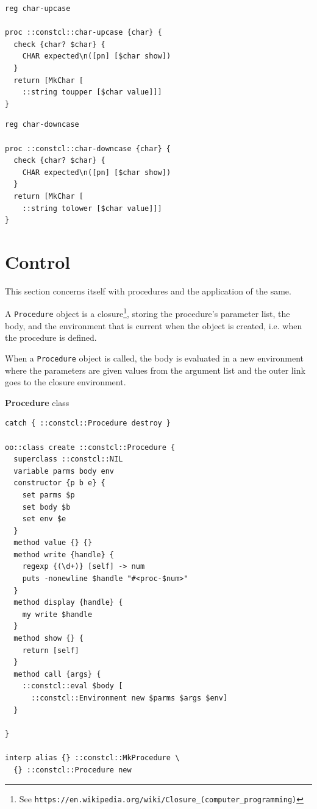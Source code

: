\documentclass[twoside,9pt]{report}
\begin{document}
\noindent\makebox[\linewidth]{\rule{\linewidth}{0.4pt}}
\begin{lstlisting}
reg char-upcase
 
proc ::constcl::char-upcase {char} {
  check {char? $char} {
    CHAR expected\n([pn] [$char show])
  }
  return [MkChar [
    ::string toupper [$char value]]]
}
\end{lstlisting}
\noindent\makebox[\linewidth]{\rule{\linewidth}{0.4pt}}
\noindent\makebox[\linewidth]{\rule{\linewidth}{0.4pt}}
\begin{lstlisting}
reg char-downcase
 
proc ::constcl::char-downcase {char} {
  check {char? $char} {
    CHAR expected\n([pn] [$char show])
  }
  return [MkChar [
    ::string tolower [$char value]]]
}
\end{lstlisting}
\noindent\makebox[\linewidth]{\rule{\linewidth}{0.4pt}}
\section{Control}
\label{control}

This section concerns itself with procedures and the application of the same.


A \texttt{Procedure} object is a closure\footnote{See \texttt{https://en.wikipedia.org/wiki/Closure\_(computer\_programming)}}, storing the procedure's parameter list, the body, and the environment that is current when the object is created, i.e. when the procedure is defined.


When a \texttt{Procedure} object is called, the body is evaluated in a new environment where the parameters are given values from the argument list and the outer link goes to the closure environment.


\textbf{Procedure} class

\noindent\makebox[\linewidth]{\rule{\linewidth}{0.4pt}}
\begin{lstlisting}
catch { ::constcl::Procedure destroy }
 
oo::class create ::constcl::Procedure {
  superclass ::constcl::NIL
  variable parms body env
  constructor {p b e} {
    set parms $p
    set body $b
    set env $e
  }
  method value {} {}
  method write {handle} {
    regexp {(\d+)} [self] -> num
    puts -nonewline $handle "#<proc-$num>"
  }
  method display {handle} {
    my write $handle
  }
  method show {} {
    return [self]
  }
  method call {args} {
    ::constcl::eval $body [
      ::constcl::Environment new $parms $args $env]
  }
 
}
 
interp alias {} ::constcl::MkProcedure \
  {} ::constcl::Procedure new
\end{lstlisting}
\noindent\makebox[\linewidth]{\rule{\linewidth}{0.4pt}}
\end{document}
